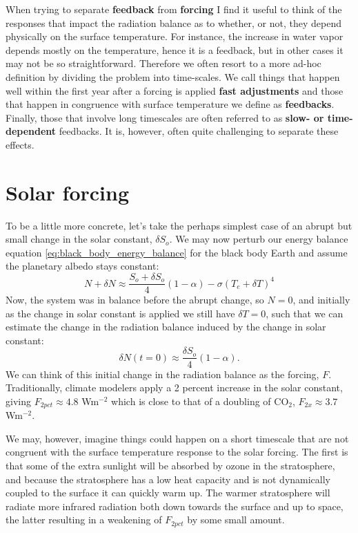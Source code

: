 \documentclass[12pt]{book}
\begin{document}
\vspace{0.5 cm}
\noindent
When trying to separate {\bf feedback} from {\bf forcing} I find it useful to think of the responses that impact the radiation balance as to whether, or not, they depend physically on the surface temperature. For instance, the increase in water vapor depends mostly on the temperature, hence it is a feedback, but in other cases it may not be so straightforward. Therefore we often resort to a more ad-hoc definition by dividing the problem into time-scales. We call things that happen well within the first year after a forcing is applied {\bf fast adjustments} and those that happen in congruence with surface temperature we define as {\bf feedbacks}. Finally, those that involve long timescales are often referred to as {\bf slow- or time-dependent} feedbacks. It is, however, often quite challenging to separate these effects. 

\section{Solar forcing}
To be a little more concrete, let's take the perhaps simplest case of an abrupt but small change in the solar constant, $\delta S_o$. We may now perturb our energy balance equation \ref{eq:black_body_energy_balance} for the black body Earth and assume the planetary albedo stays constant:
$$ N+\delta N \approx \frac{S_o+\delta S_o}{4}(1-\alpha) - \sigma (T_e+\delta T)^4 $$
Now, the system was in balance before the abrupt change, so $N=0$, and initially as the change in solar constant is applied we still have $\delta T=0$, such that we can estimate the change in the radiation balance induced by the change in solar constant:
$$ \delta N(t=0) \approx \frac{\delta S_o}{4}(1-\alpha).$$
We can think of this initial change in the radiation balance as the forcing, $F$. Traditionally, climate modelers apply a 2 percent increase in the solar constant, giving $F_{2pct}\approx 4.8$ Wm$^{-2}$ which is close to that of a doubling of CO$_2$, $F_{2x}\approx 3.7$ Wm$^{-2}$. 

We may, however, imagine things could happen on a short timescale that are not congruent with the surface temperature response to the solar forcing. The first is that some of the extra sunlight will be absorbed by ozone in the stratosphere, and because the stratosphere has a low heat capacity and is not dynamically coupled to the surface it can quickly warm up. The warmer stratosphere will radiate more infrared radiation both down towards the surface and up to space, the latter resulting in a weakening of $F_{2pct}$ by some small amount. 
\end{document}
